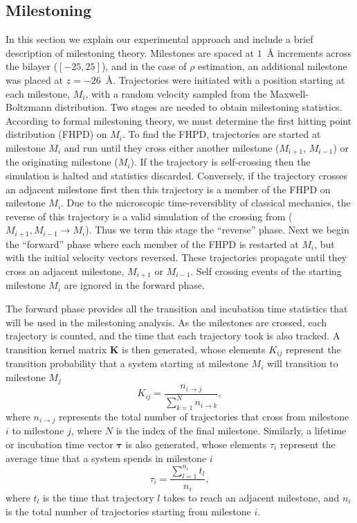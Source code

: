    \subsection{Milestoning}
        \par In this section we explain our experimental approach and include a brief description of milestoning theory. Milestones are spaced at $1$~\AA{} increments across the bilayer ($[-25,25]$), and in the case of $\rho$ estimation, an additional milestone was placed at $z = -26$~\AA. Trajectories were initiated with a position starting at each milestone, $M_i$, with a random velocity sampled from the Maxwell-Boltzmann distribution. Two stages are needed to obtain milestoning statistics. According to formal milestoning theory, we must determine the first hitting point distribution (FHPD) on $M_i$. To find the FHPD, trajectories are started at milestone $M_i$ and run until they cross either another milestone ($M_{i+1}$, $M_{i-1}$) or the originating milestone ($M_i$). If the trajectory is self-crossing then the simulation is halted and statistics discarded. Conversely, if the trajectory crosses an adjacent milestone first then this trajectory is a member of the FHPD on milestone $M_i$. Due to the microscopic time-reversiblity of classical mechanics, the reverse of this trajectory is a valid simulation of the crossing from ($M_{i+1},M_{i-1}\rightarrow M_{i}$). Thus we term this stage the ``reverse'' phase. Next we begin the ``forward'' phase where each member of the FHPD is restarted at $M_i$, but with the initial velocity vectors reversed. These trajectories propagate until they cross an adjacent milestone, $M_{i+1}$ or $M_{i-1}$. Self crossing events of the starting milestone $M_i$ are ignored in the forward phase.

        \par The forward phase provides all the transition and incubation time statistics that will be used in the milestoning analysis. As the milestones are crossed, each trajectory is counted, and the time that each trajectory took is also tracked. A transition kernel matrix $\mathbf{K}$ is then generated, whose elements $K_{ij}$ represent the transition probability that a system starting at milestone $M_i$ will transition to milestone $M_j$
        \begin{equation}
            K_{ij} = \frac {n_{i\rightarrow j}} {\sum_{k=1}^{N} n_{i \rightarrow k}},
        \end{equation}
        where $n_{i\rightarrow j}$ represents the total number of trajectories that cross from milestone $i$ to milestone $j$, where $N$ is the index of the final milestone. Similarly, a lifetime or incubation time vector $\boldsymbol{\tau}$ is also generated, whose elements $\tau_i$ represent the average time that a system spends in milestone $i$
        \begin{equation}
            \tau_{i} = \frac{\sum_{l=1}^{n_i} t_l} {n_i},
        \end{equation}
        where $t_l$ is the time that trajectory $l$ takes to reach an adjacent milestone, and $n_i$ is the total number of trajectories starting from milestone $i$.

